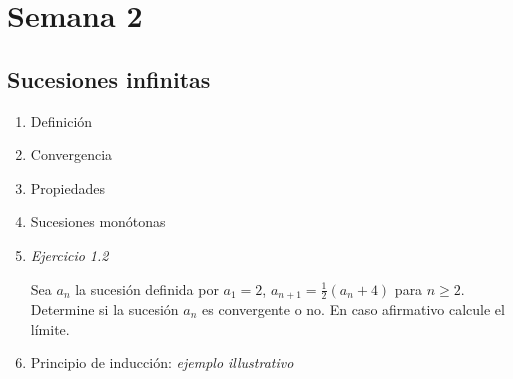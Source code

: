 \chapter{Semana 2}
\setcounter{weekpage}{1}
\thispagestyle{plainweek}


\section{Sucesiones infinitas}

\begin{enumerate}


\item Definición

\vspace{100pt}

\item Convergencia

\vspace{100pt}

\item Propiedades

\vspace{100pt}

% 
%  
%   


\newpage

\item Sucesiones monótonas

\vspace{200pt}


\item \textit{Ejercicio 1.2}

Sea $a_{ n }$ la sucesión definida por $a _{1} =2$,  $a_{n+1} = \tfrac{1}{2} (a _{n} + 4)$ para $n \geq 2$. Determine si la sucesión $a _{n} $ es convergente o no. En caso afirmativo calcule el límite.


\newpage

\item Principio de inducción: \textit{ejemplo illustrativo}


\end{enumerate}
